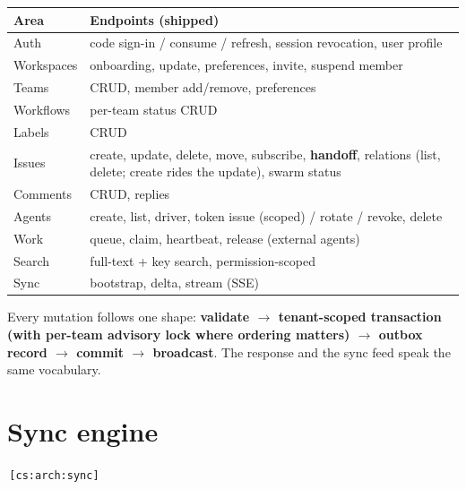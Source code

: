\documentclass[11pt,a4paper]{report}
\newcommand{\cs}[1]{\,\texttt{\scriptsize[cs:#1]}\label{cs:#1}}
\begin{document}
\begin{center}
\begin{tabular}{@{}ll@{}}
\toprule
\textbf{Area} & \textbf{Endpoints (shipped)}\\
\midrule
Auth & code sign-in / consume / refresh, session revocation, user profile\\
Workspaces & onboarding, update, preferences, invite, suspend member\\
Teams & CRUD, member add/remove, preferences\\
Workflows & per-team status CRUD\\
Labels & CRUD\\
Issues & create, update, delete, move, subscribe, \textbf{handoff},
  relations (list, delete; create rides the update), swarm status\\
Comments & CRUD, replies\\
Agents & create, list, driver, token issue (scoped) / rotate / revoke, delete\\
Work & queue, claim, heartbeat, release (external agents)\\
Search & full-text + key search, permission-scoped\\
Sync & bootstrap, delta, stream (SSE)\\
\bottomrule
\end{tabular}
\end{center}

Every mutation follows one shape: \textbf{validate $\to$ tenant-scoped
transaction (with per-team advisory lock where ordering matters) $\to$
outbox record $\to$ commit $\to$ broadcast}. The response and the sync
feed speak the same vocabulary.

\section{Sync engine}
\cs{arch:sync}
\end{document}
